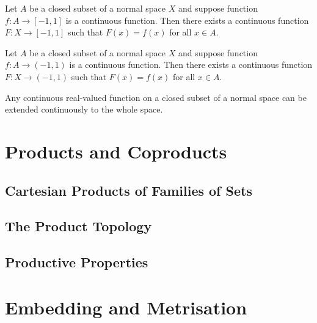 \begin{theorem}
	Let $A$ be a closed subset of a normal space $X$ and suppose function $f : A \to [-1,1]$ is a continuous function.
	Then there exists a continuous function $F : X \to [-1,1]$ such that $F(x)=f(x)$ for all $x \in A$.
\end{theorem}

\begin{theorem}
	Let $A$ be a closed subset of a normal space $X$ and suppose function $f : A \to (-1,1)$ is a continuous function.
	Then there exists a continuous function $F : X \to (-1,1)$ such that $F(x)=f(x)$ for all $x \in A$.
\end{theorem}

\begin{corollary}
	Any continuous real-valued function on a closed subset of a normal space can be extended continuously to the whole space.
\end{corollary}
\pagebreak
\section{Products and Coproducts}
\subsection{Cartesian Products of Families of Sets}
\subsection{The Product Topology}
\subsection{Productive Properties}
\pagebreak
\section{Embedding and Metrisation}
